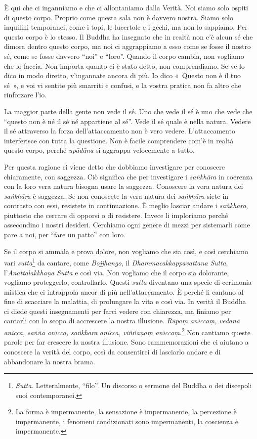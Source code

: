 È qui che ci inganniamo e che ci allontaniamo dalla Verità. Noi siamo
solo ospiti di questo corpo. Proprio come questa sala non è davvero
nostra. Siamo solo inquilini temporanei, come i topi, le lucertole e i
gechi, ma non lo sappiamo. Per questo corpo è lo stesso. Il Buddha ha
insegnato che in realtà non c'è alcun sé che dimora dentro questo corpo,
ma noi ci aggrappiamo a esso come se fosse il nostro sé, come se fosse
davvero ``noi'' e ``loro''. Quando il corpo cambia, non vogliamo che lo
faccia. Non importa quanto ci è stato detto, non comprendiamo. Se ve lo
dico in modo diretto, v'ingannate ancora di più. Io dico «~Questo non è
il tuo sé~», e voi vi sentite più smarriti e confusi, e la vostra
pratica non fa altro che rinforzare l'io.

La maggior parte della gente non vede il sé. Uno che vede il sé è uno
che vede che ``questo non è né il sé né appartiene al sé''. Vede il sé
quale è nella natura. Vedere il sé attraverso la forza
dell'attaccamento non è vero vedere. L'attaccamento interferisce con
tutta la questione. Non è facile comprendere com'è in realtà questo
corpo, perché \emph{upādāna} si aggrappa velocemente a tutto.

Per questa ragione ci viene detto che dobbiamo investigare per conoscere
chiaramente, con saggezza. Ciò significa che per investigare i
\emph{saṅkhāra} in coerenza con la loro vera natura bisogna usare la
saggezza. Conoscere la vera natura dei \emph{saṅkhāra} è saggezza. Se
non conoscete la vera natura dei \emph{saṅkhāra} siete in contrasto con
essi, resistete in continuazione. È meglio lasciar andare i
\emph{saṅkhāra}, piuttosto che cercare di opporsi o di resistere. Invece
li imploriamo perché assecondino i nostri desideri. Cerchiamo ogni
genere di mezzi per sistemarli come pare a noi, per ``fare un patto''
con loro.

Se il corpo si ammala e prova dolore, non vogliamo che sia così, e così
cerchiamo vari \emph{sutta}\footnote{\emph{Sutta.} Letteralmente,
  ``filo''. Un discorso o sermone del Buddha o dei discepoli suoi
  contemporanei.} da cantare, come \emph{Bojjhango}, il
\emph{Dhammacakkappavattana Sutta}, l'\emph{Anattalakkhaṇa Sutta} e così
via. Non vogliamo che il corpo sia dolorante, vogliamo proteggerlo,
controllarlo. Questi \emph{sutta} diventano una specie di cerimonia
mistica che ci intrappola ancor di più nell'attaccamento. È perché li
cantano al fine di scacciare la malattia, di prolungare la vita e così
via. In verità il Buddha ci diede questi insegnamenti per farci vedere
con chiarezza, ma finiamo per cantarli con lo scopo di accrescere la
nostra illusione. \emph{Rūpaṃ aniccaṃ, vedanā aniccā, saññā aniccā,
saṅkhāra} \emph{aniccā, viññāṇaṃ aniccaṃ}.\footnote{La forma è
  impermanente, la sensazione è impermanente, la percezione è
  impermanente, i fenomeni condizionati sono impermanenti, la coscienza
  è impermanente.} Non cantiamo queste parole per far crescere la nostra
illusione. Sono rammemorazioni che ci aiutano a conoscere la verità del
corpo, così da consentirci di lasciarlo andare e di abbandonare la
nostra brama.


